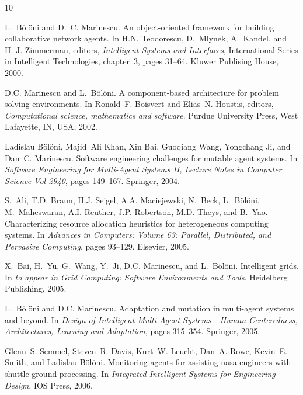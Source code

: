 \begin{thebibliography}{10}

L.~B\"ol\"oni and D.~C. Marinescu.
\newblock An object-oriented framework for building collaborative network
  agents.
\newblock In H.N. Teodorescu, D.~Mlynek, A.~Kandel, and H.-J. Zimmerman,
  editors, {\em Intelligent Systems and Interfaces}, International Series in
  Intelligent Technologies, chapter~3, pages 31--64. Kluwer Publising House,
  2000.

D.C. Marinescu and L.~B{\"o}l{\"o}ni.
\newblock A component-based architecture for problem solving environments.
\newblock In Ronald~F. Boisvert and Elias~N. Houstis, editors, {\em
  Computational science, mathematics and software}. Purdue University Press,
  West Lafayette, IN, USA, 2002.

Ladislau B{\"o}l{\"o}ni, Majid~Ali Khan, Xin Bai, Guoqiang Wang, Yongchang Ji,
  and Dan~C. Marinescu.
\newblock Software engineering challenges for mutable agent systems.
\newblock In {\em Software Engineering for Multi-Agent Systems II, Lecture
  Notes in Computer Science Vol 2940}, pages 149--167. Springer, 2004.

S.~Ali, T.D. Braun, H.J. Seigel, A.A. Maciejewski, N.~Beck, L.~B{\"o}l{\"o}ni,
  M.~Maheswaran, A.I. Reuther, J.P. Robertson, M.D. Theys, and B.~Yao.
\newblock Characterizing resource allocation heuristics for heterogeneous
  computing systems.
\newblock In {\em Advances in Computers: Volume 63: Parallel, Distributed, and
  Pervasive Computing}, pages 93--129. Elsevier, 2005.

X.~Bai, H.~Yu, G.~Wang, Y.~Ji, D.C. Marinescu, and L.~B{\"o}l{\"o}ni.
\newblock Intelligent grids.
\newblock In {\em to appear in Grid Computing: Software Environments and
  Tools}. Heidelberg Publishing, 2005.

L.~B{\"o}l{\"o}ni and D.C. Marinescu.
\newblock Adaptation and mutation in multi-agent systems and beyond.
\newblock In {\em Design of Intelligent Multi-Agent Systems - Human
  Centeredness, Architectures, Learning and Adaptation}, pages 315--354.
  Springer, 2005.

Glenn~S. Semmel, Steven~R. Davis, Kurt~W. Leucht, Dan~A. Rowe, Kevin~E. Smith,
  and Ladislau B{\"o}l{\"o}ni.
\newblock Monitoring agents for assisting nasa engineers with shuttle ground
  processing.
\newblock In {\em Integrated Intelligent Systems for Engineering Design}. IOS
  Press, 2006.


\end{thebibliography}
